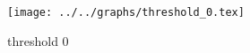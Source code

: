 \begin{figure}[h] \centering\texttt{[image: ../../graphs/threshold\_0.tex]}\caption{threshold 0}\label{gr:threshold_0} \end{figure}
